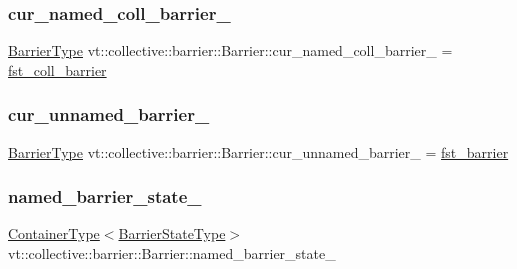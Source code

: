 \subsubsection{\texorpdfstring{cur\+\_\+named\+\_\+coll\+\_\+barrier\+\_\+}{cur\_named\_coll\_barrier\_}}
{\footnotesize\ttfamily \hyperlink{namespacevt_a25e481f0d6bbc7204db23d1c87a62e77}{Barrier\+Type} vt\+::collective\+::barrier\+::\+Barrier\+::cur\+\_\+named\+\_\+coll\+\_\+barrier\+\_\+ = \hyperlink{namespacevt_1_1collective_1_1barrier_a02bc7e6a890bd33f1e0b1b264326099c}{fst\+\_\+coll\+\_\+barrier}\hspace{0.3cm}{\ttfamily [private]}}

\mbox{\label{structvt_1_1collective_1_1barrier_1_1_barrier_a320d125e93446c9f39baab502c260a1f}} 
\subsubsection{\texorpdfstring{cur\+\_\+unnamed\+\_\+barrier\+\_\+}{cur\_unnamed\_barrier\_}}
{\footnotesize\ttfamily \hyperlink{namespacevt_a25e481f0d6bbc7204db23d1c87a62e77}{Barrier\+Type} vt\+::collective\+::barrier\+::\+Barrier\+::cur\+\_\+unnamed\+\_\+barrier\+\_\+ = \hyperlink{namespacevt_1_1collective_1_1barrier_a43d35d830e81f62b5dfb571ce5e0939e}{fst\+\_\+barrier}\hspace{0.3cm}{\ttfamily [private]}}

\mbox{\label{structvt_1_1collective_1_1barrier_1_1_barrier_ae5a50600bf815ba049915d93bc48b727}} 
\subsubsection{\texorpdfstring{named\+\_\+barrier\+\_\+state\+\_\+}{named\_barrier\_state\_}}
{\footnotesize\ttfamily \hyperlink{structvt_1_1collective_1_1barrier_1_1_barrier_a84bfbd26a48a1c3bb7272e81245e4873}{Container\+Type}$<$\hyperlink{structvt_1_1collective_1_1barrier_1_1_barrier_a9b612818f7b44ca65f2caee0dee094f3}{Barrier\+State\+Type}$>$ vt\+::collective\+::barrier\+::\+Barrier\+::named\+\_\+barrier\+\_\+state\+\_\+\hspace{0.3cm}{\ttfamily [private]}}

